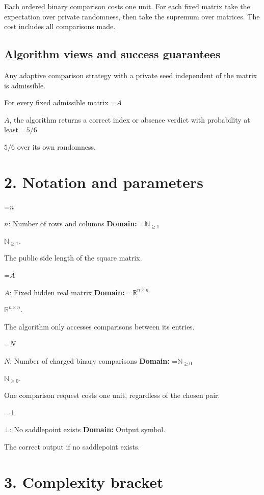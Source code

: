 \documentclass[10pt,a4paper]{article}
\newcommand{\AtlasMath}[1]{\par\begingroup\centering\setbox0=\hbox{$\displaystyle #1$}\ifdim\wd0>1.4\linewidth\typeout{ATLAS WIDE FORMULA: \the\wd0}\fi\ifdim\wd0>\linewidth\resizebox{\linewidth}{!}{\box0}\else\box0\fi\par\endgroup}
\newcommand{\AtlasInlineMath}[1]{\begingroup\setbox0=\hbox{$#1$}\ifdim\wd0>.4\linewidth\endgroup\AtlasMath{#1}\else\endgroup$#1$\fi}
\begin{document}
Each ordered binary comparison costs one unit. For each fixed matrix take the expectation over private randomness, then take the supremum over matrices. The cost includes all comparisons made.



\subsection{Algorithm views and success guarantees}


Any adaptive comparison strategy with a private seed independent of the matrix is admissible.



For every fixed admissible matrix \AtlasInlineMath{A}, the algorithm returns a correct index or absence verdict with probability at least \AtlasInlineMath{5/6} over its own randomness.



\section{2. Notation and parameters}


\AtlasInlineMath{n}: Number of rows and columns \textbf{Domain:} \AtlasInlineMath{\mathbb N_{\ge1}}.



The public side length of the square matrix.



\AtlasInlineMath{A}: Fixed hidden real matrix \textbf{Domain:} \AtlasInlineMath{\mathbb R^{n\times n}}.



The algorithm only accesses comparisons between its entries.



\AtlasInlineMath{N}: Number of charged binary comparisons \textbf{Domain:} \AtlasInlineMath{\mathbb N_{\ge0}}.



One comparison request costs one unit, regardless of the chosen pair.



\AtlasInlineMath{\bot}: No saddlepoint exists \textbf{Domain:} Output symbol.



The correct output if no saddlepoint exists.



\section{3. Complexity bracket}
\end{document}
